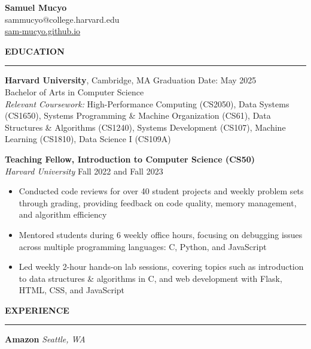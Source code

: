 \documentclass[11pt,a4paper]{article}
\newcommand{\sectionheading}[1]{\vspace{0.2cm}\textbf{\Large #1}\vspace{0.1cm}\hrule\vspace{0.3cm}}
\newcommand{\subheading}[1]{\textbf{#1}}
\newcommand{\daterange}[1]{\hfill{#1}}
\begin{document}
\begin{center}
    \textbf{\LARGE Samuel Mucyo}\\
    \vspace{0.3cm}
    sammucyo@college.harvard.edu \\
    \href{https://sam-mucyo.github.io/}{sam-mucyo.github.io} \\
\end{center}


\sectionheading{EDUCATION}
\subheading{Harvard University}, Cambridge, MA \daterange{Graduation Date: May 2025}\\
Bachelor of Arts in Computer Science\\
\textit{Relevant Coursework:} High-Performance Computing (CS2050), Data Systems (CS1650), Systems Programming \& Machine Organization (CS61), Data Structures \& Algorithms (CS1240), Systems Development (CS107), Machine Learning (CS1810), Data Science I (CS109A)

\medbreak
\subheading{Teaching Fellow, Introduction to Computer Science (CS50)}\\
\textit{Harvard University} \daterange{Fall 2022 and Fall 2023}
\begin{itemize}[leftmargin=*,nosep]
    \item Conducted code reviews for over 40 student projects and weekly problem sets through grading, providing feedback on code quality, memory management, and algorithm efficiency
    \item Mentored students during 6 weekly office hours, focusing on debugging issues across multiple programming languages: C, Python, and JavaScript
    \item Led weekly 2-hour hands-on lab sessions, covering topics such as introduction to data structures \& algorithms in C, and web development with Flask, HTML, CSS, and JavaScript
\end{itemize}

\sectionheading{EXPERIENCE}
\subheading{Amazon} \hfill \textit{Seattle, WA}
\end{document}

